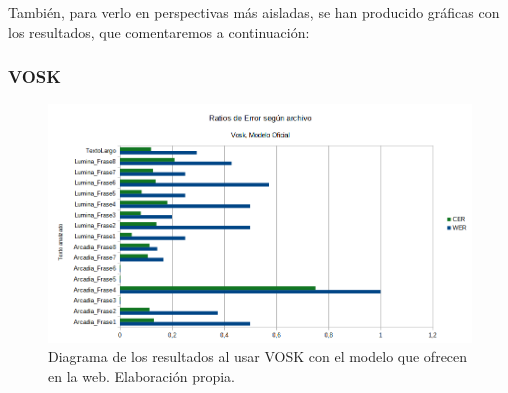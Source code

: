 También, para verlo en perspectivas más aisladas, se han producido gráficas con los resultados, que comentaremos a continuación:

\subsubsection{VOSK}

\begin{figure}[H]
	\includegraphics[width=\textwidth]{imagenes/WERCER_VoskIvan.png}
	\caption[Diagramas de WER y CER - Vosk]{Diagrama de los resultados al usar VOSK con el modelo que ofrecen en la web. Elaboración propia.}
\end{figure}

